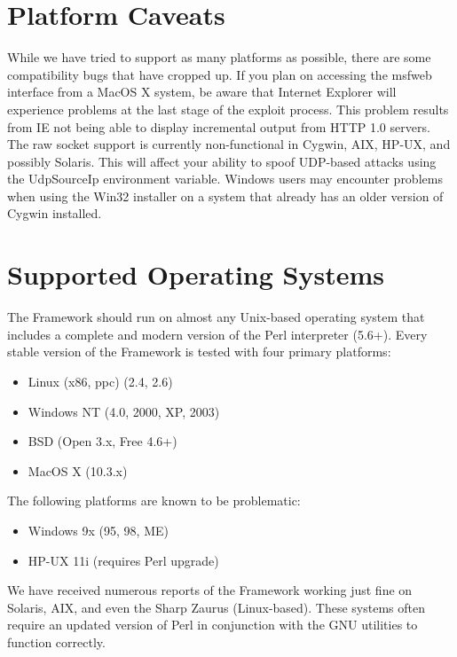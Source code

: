 \documentclass{report}
\begin{document}
    \section{Platform Caveats}
    \label{INSTALL-CAVEAT}
\par
While we have tried to support as many platforms as possible, there are some
compatibility bugs that have cropped up. If you plan on accessing the msfweb
interface from a MacOS X system, be aware that Internet Explorer will experience
problems at the last stage of the exploit process. This problem results from IE
not being able to display incremental output from HTTP 1.0 servers. The raw
socket support is currently non-functional in Cygwin, AIX, HP-UX, and possibly
Solaris. This will affect your ability to spoof UDP-based attacks using the
UdpSourceIp environment variable. Windows users may encounter problems when
using the Win32 installer on a system that already has an older version of
Cygwin installed. 

    \section{Supported Operating Systems}
    \label{INSTALL-SUPPORT}
\par
The Framework should run on almost any Unix-based operating system that includes
a complete and modern version of the Perl interpreter (5.6+). Every stable
version of the Framework is tested with four primary platforms: 

\begin{itemize}
\item Linux (x86, ppc) (2.4, 2.6)
\item Windows NT (4.0, 2000, XP, 2003)
\item BSD (Open 3.x, Free 4.6+)
\item MacOS X (10.3.x)
\end{itemize}

\par
The following platforms are known to be problematic:
\begin{itemize}
\item Windows 9x (95, 98, ME)
\item HP-UX 11i (requires Perl upgrade)
\end{itemize}

\par
We have received numerous reports of the Framework working just fine on Solaris,
AIX, and even the Sharp Zaurus (Linux-based). These systems often require an
updated version of Perl in conjunction with the GNU utilities to function
correctly. 
\end{document}
